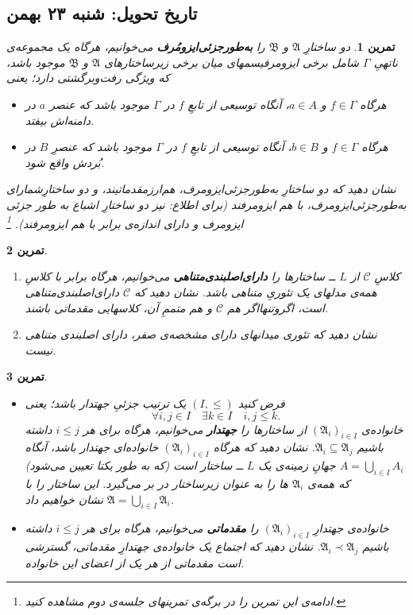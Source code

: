 \documentclass[12pt,a4paper]{report}
\theoremstyle{colorhead}
\newtheorem{tam}{تمرین}
\begin{document}
\subsection*{تاریخ تحویل: شنبه ۲۳ بهمن}
\begin{tam}
\label{backandforth1}
دو ساختارِ
$\mathfrak{A}$
و
$\mathfrak{B}$
را 
\textbf{به‌طور‌جزئی‌ایزومُرف}
می‌خوانیم، هرگاه 
یک مجموعه‌ی ناتهیِ
$\Gamma$
شامل برخی ایزومرفیسمهای میان برخی زیرساختارهای 
$\mathfrak{A}$
و
$\mathfrak{B}$
موجود باشد، که ویژگی رفت‌و‌برگشتی دارد؛ یعنی
\begin{itemize}
\item
هرگاه
$f\in \Gamma$
و
$a\in A$،
آنگاه توسیعی از تابعِ
$f$
در
$\Gamma$
موجود باشد که عنصر
$a$
در دامنه‌اش بیفتد.
\item
هرگاه
$f\in \Gamma$
و
$b\in B$،
آنگاه توسیعی از تابعِ
$f$
در
$\Gamma$
موجود باشد که عنصرِ
$B$
در بُردش واقع شود.
\end{itemize}
نشان دهید که دو ساختارِ به‌طور‌جزئی‌ایزومرف، هم‌ارزمقدماتیند، و دو ساختارِشمارای به‌طورجزئی‌ایزومرف، با هم ایزومرفند (برای اطلاع:  نیز دو ساختارِ اشباع
به طور جزئی ایزومرف و دارای
اندازه‌ی برابر
 با هم ایزومرفند).
\footnote{
ادامه‌ی این تمرین را در برگه‌ی تمرینهای جلسه‌ی دوم مشاهده کنید.}
\end{tam}
\begin{tam}
\hfill
\begin{enumerate}
\item
کلاسِ
$\mathcal{C}$
از
$L$ ــ
ساختارها را 
\textbf{دارای‌اصلبندی‌متناهی}
می‌خوانیم، هرگاه برابر با کلاسِ همه‌ی مدلهای یک تئوریِ متناهی باشد. 
نشان دهید که
$\mathcal{C}$
دارای‌اصلبندی‌متناهی است، اگروتنهااگر هم
$\mathcal{C}$
و هم متممِ آن، کلاسهایی مقدماتی باشند. 
\item 
 نشان دهید که 
تئوری میدانهای دارای مشخصه‌ی صفر، دارای اصلبندی متناهی نیست.
\end{enumerate}
\end{tam}
\begin{tam}
\begin{itemize}
\item
فرض کنید
$(I,\leq)$
یک ترتیب جزئیِ جهتدار باشد؛ یعنی
\[
\forall i,j\in I \quad \exists k\in I \quad i,j\leq k.
\]
خانواده‌ی
$(\mathfrak{A}_i)_{i\in I}$
از ساختارها را \textbf{جهتدار} می‌خوانیم، هرگاه برای هر
$i\leq j$
داشته باشیم
$\mathfrak{A}_i\subseteq \mathfrak{A}_j$.
نشان دهید که هرگاه
$(\mathfrak{A}_i)_{i\in I}$
خانواده‌ای جهتدار باشد، آنگاه
$A=\bigcup_{i\in I} A_i$
جهانِ زمینه‌ی یک 
$L$
ــ
ساختار است (که به طور یکتا تعیین می‌شود) که همه‌ی
$\mathfrak{A}_i$
ها را به عنوان زیرساختار در بر می‌گیرد. این ساختار را با
$\mathfrak{A}=\bigcup_{i\in I} \mathfrak{A}_i$
نشان خواهیم داد. 
\item
خانواده‌ی جهتدارِ
$(\mathfrak{A}_i)_{i\in I}$
را \textbf{مقدماتی }می‌خوانیم، هرگاه برای
هر
$i\leq j$
داشته باشیم
\mbox{$\mathfrak{A}_i\prec \mathfrak{A}_j$}.
نشان دهید که اجتماع یک خانواده‌ی جهتدارِ مقدماتی، گسترشی است مقدماتی از هر یک از اعضای این خانواده. 
 	 
\end{itemize}
\end{tam}
\end{document}

